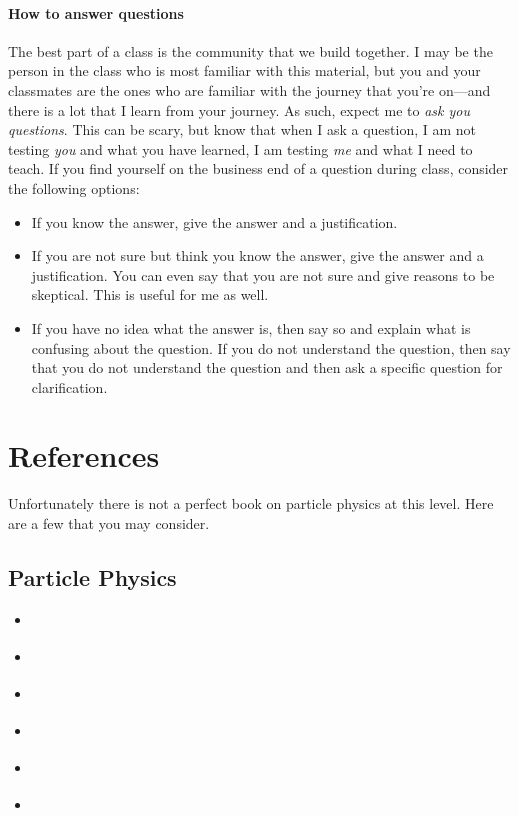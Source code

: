 \documentclass[12pt, oneside]{report}    %
\let\oldsection\section
\def\section{%
  \setcounter{sidenote}{1}%
  \oldsection
}
\begin{document}
\paragraph{How to answer questions} The best part of a class is the community that we build together. I may be the person in the class who is most familiar with this material, but you and your classmates are the ones who are familiar with the journey that you're on---and there is a lot that I learn from your journey. As such, expect me to \emph{ask you questions}. This can be scary, but know that when I ask a question, I am not testing \emph{you} and what you have learned, I am testing \emph{me} and what I need to teach. If you find yourself on the business end of a question during class, consider the following options:
\begin{itemize}
    \item If you know the answer, give the answer and a justification.
    \item If you are not sure but think you know the answer, give the answer and a justification. You can even say that you are not sure and give reasons to be skeptical. This is useful for me as well.
    \item If you have no idea what the answer is, then say so and explain what is confusing about the question. If you do not understand the question, then say that you do not understand the question and then ask a specific question for clarification. 
\end{itemize}%

\section{References}
Unfortunately there is not a perfect book on particle physics at this level. Here are a few that you may consider. 

\subsection{Particle Physics}
\begin{itemize}
    \item \cite{Griffiths:2008zz}
    \item \cite{Larkoski:2019jnv}
    \item \cite{Peskin:2019iig}
    \item \cite{Cahn:1989by}
    \item \cite{Goldberg:2017dlc}
    \item \cite{Bettini:2008zz}
\end{itemize}
\end{document}
